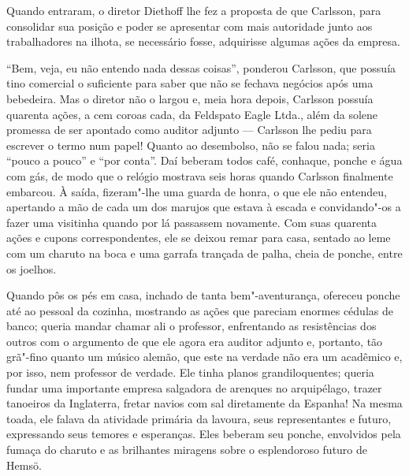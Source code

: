 Quando entraram, o diretor Diethoff lhe fez a proposta de que Carlsson, para consolidar
sua posição e poder se apresentar com mais autoridade junto aos trabalhadores na
ilhota, se necessário fosse, adquirisse algumas ações da empresa. 

``Bem, veja, eu não entendo nada dessas coisas'', ponderou Carlsson, que possuía tino comercial o
suficiente para saber que não se fechava negócios após uma bebedeira. Mas o
diretor não o largou e, meia hora depois, Carlsson possuía quarenta ações, a cem
coroas cada, da Feldspato Eagle Ltda., além da solene promessa de ser apontado
como auditor adjunto --- Carlsson lhe pediu para escrever o termo num papel!
Quanto ao desembolso, não se falou nada; seria ``pouco a pouco'' e ``por
conta''. Daí beberam todos café, conhaque, ponche e água com gás, de modo que o
relógio mostrava seis horas quando Carlsson finalmente embarcou. À saída,
fizeram"-lhe uma guarda de honra, o que ele não entendeu, apertando a mão de cada
um dos marujos que estava à escada e convidando"-os a fazer uma visitinha quando
por lá passassem novamente. Com suas quarenta ações e cupons correspondentes,
ele se deixou remar para casa, sentado ao leme com um charuto na boca e uma
garrafa trançada de palha, cheia de ponche, entre os joelhos.

Quando pôs os pés em casa, inchado de tanta bem"-aventurança, ofereceu ponche até
ao pessoal da cozinha, mostrando as ações que pareciam enormes cédulas de banco;
queria mandar chamar ali o professor, enfrentando as resistências dos outros com
o argumento de que ele agora era auditor adjunto e, portanto, tão grã"-fino quanto um
músico alemão, que este na verdade não era um acadêmico e, por isso, nem
professor de verdade. Ele tinha planos grandiloquentes; queria fundar uma
importante empresa salgadora de arenques no arquipélago, trazer tanoeiros da
Inglaterra, fretar navios com sal diretamente da Espanha! Na mesma toada, ele
falava da atividade primária da lavoura, seus representantes e futuro,
expressando seus temores e esperanças. Eles beberam seu ponche, envolvidos pela
fumaça do charuto e as brilhantes miragens sobre o esplendoroso futuro de Hemsö.

